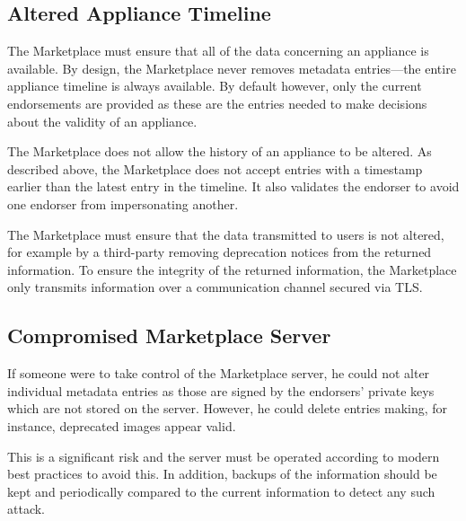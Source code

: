 \subsection{Altered Appliance Timeline}

The Marketplace must ensure that all of the data concerning an
appliance is available.  By design, the Marketplace never removes
metadata entries---the entire appliance timeline is always available.
By default however, only the current endorsements are provided as
these are the entries needed to make decisions about the validity of
an appliance.

The Marketplace does not allow the history of an appliance to be
altered.  As described above, the Marketplace does not accept entries
with a timestamp earlier than the latest entry in the timeline.  It
also validates the endorser to avoid one endorser from impersonating
another.

The Marketplace must ensure that the data transmitted to users is not
altered, for example by a third-party removing deprecation notices
from the returned information.  To ensure the integrity of the
returned information, the Marketplace only transmits information over
a communication channel secured via TLS\@.

\subsection{Compromised Marketplace Server}

If someone were to take control of the Marketplace server, he could
not alter individual metadata entries as those are signed by the
endorsers' private keys which are not stored on the server.  However, he
could delete entries making, for instance, deprecated images appear
valid.

This is a significant risk and the server must be operated according
to modern best practices to avoid this.  In addition, backups of the
information should be kept and periodically compared to the current
information to detect any such attack.
